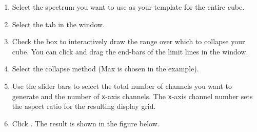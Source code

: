 \documentclass[11pt,oneside,chapters]{starlink}
\begin{document}
\begin{enumerate}[label=(\textbf{\arabic*})]
\item  Select the spectrum you want to use as your template for the entire cube.

\item Select the  tab in the  window.

\item Check the  box to interactively
draw the range over which to collapse your cube. You can click and
drag the end-bars of the limit lines in the 
window.

\item Select the collapse method (Max is chosen in the example).


\item Use the slider bars to select the total number of channels you
want to generate and the number of \texttt{x}-axis channels. The
\texttt{x}-axis channel number sets the aspect ratio for the resulting
display grid.

\item Click . The result is shown in the figure below.

\end{enumerate}
\end{document}

